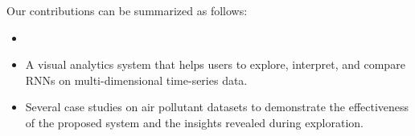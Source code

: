 Our contributions can be summarized as follows:
\begin{itemize}[noitemsep]
  \item {}
  \item A visual analytics system that helps users to explore, interpret, and compare RNNs on multi-dimensional time-series data. 
  \item Several case studies on air pollutant datasets to demonstrate the effectiveness of the proposed system and the insights revealed during exploration.
\end{itemize}





